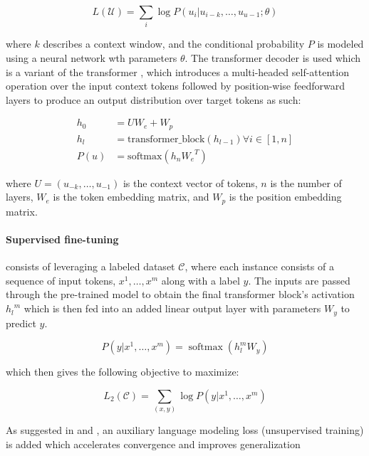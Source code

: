 \documentclass[a4paper,12pt,twoside,openright]{report}
\begin{document}
\begin{equation}
L(\mathcal{U}) = \sum_i \log P(u_i | u_{i-k}, \ldots, u_{u-1}; \theta )
\end{equation}

where $k$ describes a context window, and the conditional probability $P$ is modeled using a neural network wth parameters $\theta$. 
The transformer decoder \cite{Liu18} is used which is a variant of the transformer \cite{vaswani17}, which introduces a multi-headed self-attention operation over the input context tokens followed by position-wise feedforward layers to produce an output distribution over target tokens as such:

\begin{align}
h_0 & = UW_e + W_p \\
h_l & = \text{transformer\_block}(h_{l-1}) \forall i \in [1, n] \\
P(u) & = \text{softmax}(h_n {W_e}^T)
\end{align}

where $U=\left(u_{-k}, \ldots, u_{-1}\right)$ is the context vector of tokens, $n$ is the number of layers, $W_e$ is the token embedding matrix, and $W_p$ is the position embedding matrix.

\paragraph{Supervised fine-tuning} consists of leveraging a labeled dataset $\mathcal{C}$, where each instance consists of a sequence of input tokens, $x^1, \ldots, x^m$ along with a label $y$.
The inputs are passed through the pre-trained model to obtain the final transformer block's activation ${h_l}^m$ which is then fed into an added linear output layer with parameters $W_y$ to predict $y$.

\begin{equation}
P\left(y | x^{1}, \ldots, x^{m}\right)=\operatorname{softmax}\left(h_{l}^{m} W_{y}\right)
\end{equation}

which then gives the following objective to maximize:

\begin{equation}
L_{2}(\mathcal{C})=\sum_{(x, y)} \log P\left(y | x^{1}, \ldots, x^{m}\right)
\end{equation}

As suggested in \cite{Rei17} and \cite{peters17a}, an auxiliary language modeling loss (unsupervised training) is added which accelerates convergence and improves generalization
\end{document}
